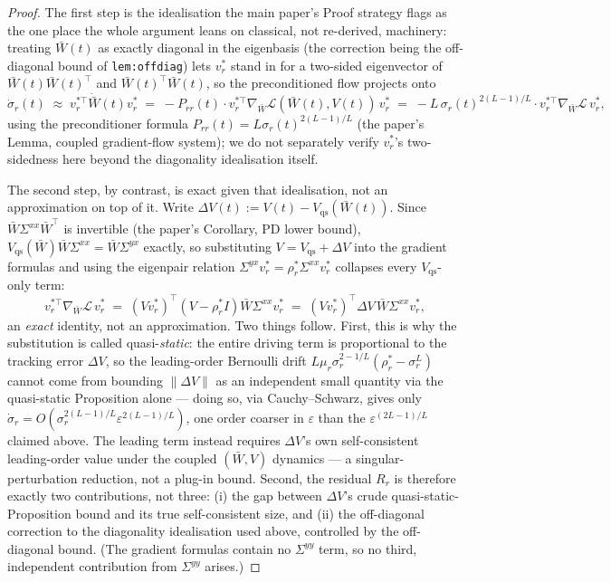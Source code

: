 \documentclass[11pt]{article}
\newcommand{\Wbar}{\bar{W}}
\newcommand{\Sxx}{\Sigma^{xx}}
\newcommand{\Syx}{\Sigma^{yx}}
\newcommand{\eps}{\varepsilon}
\newcommand{\rhostar}{\rho_r^*}
\newcommand{\sigmar}{\sigma_r}
\theoremstyle{plain}
\theoremstyle{definition}
\theoremstyle{remark}
\begin{document}
\begin{proof}
The first step is the idealisation the main paper's Proof strategy flags as the one
place the whole argument leans on classical, not re-derived, machinery: treating
$\Wbar(t)$ as exactly diagonal in the eigenbasis (the correction being the
off-diagonal bound of \texttt{lem:offdiag}) lets $v_r^*$ stand in for a two-sided
eigenvector of $\Wbar(t)\Wbar(t)^\top$ and $\Wbar(t)^\top\Wbar(t)$, so the
preconditioned flow projects onto
\[
\dot\sigmar(t) \;\approx\; v_r^{*\top}\dot{\Wbar}(t)v_r^*
\;=\; -P_{rr}(t)\cdot v_r^{*\top}\nabla_{\Wbar}\mathcal{L}(\Wbar(t),V(t))\,v_r^*
\;=\; -L\,\sigmar(t)^{2(L-1)/L}\cdot v_r^{*\top}\nabla_{\Wbar}\mathcal{L}\,v_r^*,
\]
using the preconditioner formula $P_{rr}(t) = L\sigma_r(t)^{2(L-1)/L}$ (the paper's
Lemma, coupled gradient-flow system); we do not separately verify $v_r^*$'s
two-sidedness here beyond the diagonality idealisation itself.

The second step, by contrast, is exact given that idealisation, not an approximation
on top of it. Write $\Delta V(t) := V(t) - V_{\mathrm{qs}}(\Wbar(t))$. Since
$\Wbar\Sxx\Wbar^\top$ is invertible (the paper's Corollary, PD lower bound),
$V_{\mathrm{qs}}(\Wbar)\Wbar\Sxx = \Wbar\Syx$ exactly, so substituting
$V = V_{\mathrm{qs}} + \Delta V$ into the gradient formulas and using the
eigenpair relation $\Syx v_r^* = \rhostar\Sxx v_r^*$ collapses every
$V_{\mathrm{qs}}$-only term:
\[
v_r^{*\top}\nabla_{\Wbar}\mathcal{L}\,v_r^*
\;=\;
(Vv_r^*)^\top(V-\rhostar I)\Wbar\Sxx v_r^*
\;=\;
(Vv_r^*)^\top\Delta V\,\Wbar\Sxx v_r^*,
\]
an \emph{exact} identity, not an approximation. Two things follow. First, this is why
the substitution is called quasi-\emph{static}: the entire driving term is
proportional to the tracking error $\Delta V$, so the leading-order Bernoulli drift
$L\mu_r\sigmar^{2-1/L}(\rhostar-\sigmar^L)$ cannot come from bounding $\|\Delta V\|$
as an independent small quantity via the quasi-static Proposition alone — doing so,
via Cauchy--Schwarz, gives only $\dot\sigmar =
O(\sigmar^{2(L-1)/L}\eps^{2(L-1)/L})$, one order coarser in $\eps$ than the
$\eps^{(2L-1)/L}$ claimed above. The leading term instead requires $\Delta V$'s own
self-consistent leading-order value under the coupled $(\Wbar,V)$ dynamics — a
singular-perturbation reduction, not a plug-in bound. Second, the residual $R_r$ is
therefore exactly two contributions, not three: (i) the gap between $\Delta V$'s
crude quasi-static-Proposition bound and its true self-consistent size, and (ii) the
off-diagonal correction to the diagonality idealisation used above, controlled by the
off-diagonal bound. (The gradient formulas contain no $\Sigma^{yy}$ term, so no
third, independent contribution from $\Sigma^{yy}$ arises.)
\end{proof}
\end{document}
